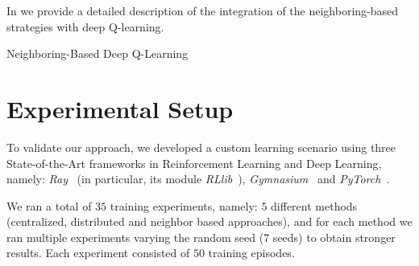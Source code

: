 \documentclass[sigconf]{acmart}
\begin{document}
In  we provide a detailed description of the integration of the neighboring-based strategies with deep Q-learning.
\begin{algorithm}
  \caption{Neighboring-Based Deep Q-Learning}
  \label{alg:neighbor_dqn}
\end{algorithm}
\section{Experimental Setup}\label{sec:experiments}

To validate our approach, we developed a custom learning scenario using three State-of-the-Art frameworks 
  in Reinforcement Learning and Deep Learning, namely: \emph{Ray}~\cite{DBLP:conf/osdi/MoritzNWTLLEYPJ18} 
  (in particular, its module \emph{RLlib}~\cite{DBLP:conf/icml/LiangLNMFGGJS18}),
  \emph{Gymnasium}~\cite{DBLP:journals/corr/abs-2407-17032}
  and \emph{PyTorch}~\cite{DBLP:conf/nips/PaszkeGMLBCKLGA19}.

We ran a total of $35$ training experiments, namely: $5$ different methods 
  (centralized, distributed and neighbor based approaches), and for each method we ran multiple experiments
  varying the random seed (7 seeds) to obtain stronger results. 
%
Each experiment consisted of $50$ training episodes. 
\end{document}
